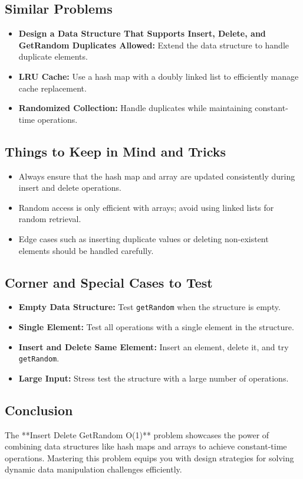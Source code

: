 \subsection*{Similar Problems}
\begin{itemize}
    \item \textbf{Design a Data Structure That Supports Insert, Delete, and GetRandom Duplicates Allowed:} Extend the data structure to handle duplicate elements.
    \item \textbf{LRU Cache:} Use a hash map with a doubly linked list to efficiently manage cache replacement.
    \item \textbf{Randomized Collection:} Handle duplicates while maintaining constant-time operations.
\end{itemize}

\subsection*{Things to Keep in Mind and Tricks}
\begin{itemize}
    \item Always ensure that the hash map and array are updated consistently during insert and delete operations.
    \item Random access is only efficient with arrays; avoid using linked lists for random retrieval.
    \item Edge cases such as inserting duplicate values or deleting non-existent elements should be handled carefully.
\end{itemize}

\subsection*{Corner and Special Cases to Test}
\begin{itemize}
    \item \textbf{Empty Data Structure:} Test \texttt{getRandom} when the structure is empty.
    \item \textbf{Single Element:} Test all operations with a single element in the structure.
    \item \textbf{Insert and Delete Same Element:} Insert an element, delete it, and try \texttt{getRandom}.
    \item \textbf{Large Input:} Stress test the structure with a large number of operations.
\end{itemize}

\subsection*{Conclusion}
The **Insert Delete GetRandom O(1)** problem showcases the power of combining data structures like hash maps and arrays to achieve constant-time operations. Mastering this problem equips you with design strategies for solving dynamic data manipulation challenges efficiently.